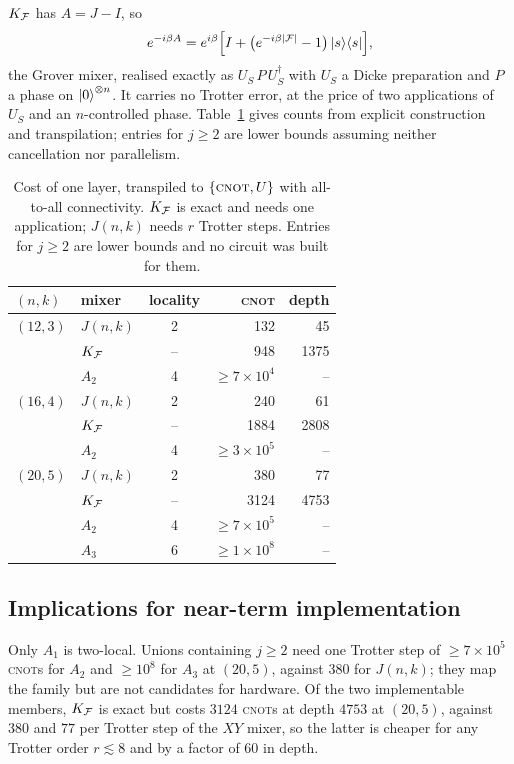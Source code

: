 $K_{\mathcal{F}}$ has $A=J-I$, so
\begin{equation}
e^{-i\beta A}=e^{i\beta}\Bigl[I +\bigl(e^{-i\beta|\mathcal{F}|}-1\bigr)\ket{s}\!\bra{s}\Bigr],
    \label{eq:grover-mixer}
\end{equation}
the Grover mixer, realised exactly as $U_S\,P\,U_S^{\dagger}$ with $U_S$ a Dicke preparation and $P$ a phase on $\ket{0}^{\otimes n}$. It carries no Trotter error, at the price of two applications of $U_S$ and an $n$-controlled phase. Table~\ref{tab:circuits} gives counts from explicit construction and transpilation; entries for $j\ge2$ are lower bounds assuming neither cancellation nor parallelism.

\begin{table}[t]
  \caption{Cost of one layer, transpiled to $\{\textsc{cnot},U\}$ with
all-to-all connectivity. $K_{\mathcal{F}}$ is exact and needs one application; $J(n,k)$ needs $r$ Trotter steps. Entries for $j\ge2$ are lower bounds and no circuit was built for them.}
  \label{tab:circuits}
  \begin{ruledtabular}
  \begin{tabular}{llcrr}
$(n,k)$ & mixer & locality & \textsc{cnot} & depth \\ \hline
    $(12,3)$ & $J(n,k)$ & 2  & 132  & 45   \\
             & $K_{\mathcal{F}}$ & -- & 948  & 1375 \\
             & $A_2$    & 4  & $\ge7\times10^{4}$ & -- \\[2pt]
    $(16,4)$ & $J(n,k)$ & 2  & 240  & 61   \\
             & $K_{\mathcal{F}}$ & -- & 1884 & 2808 \\
             & $A_2$    & 4  & $\ge3\times10^{5}$ & -- \\[2pt]
    $(20,5)$ & $J(n,k)$ & 2  & 380  & 77   \\
             & $K_{\mathcal{F}}$ & -- & 3124 & 4753 \\
             & $A_2$    & 4  & $\ge7\times10^{5}$ & -- \\
             & $A_3$    & 6  & $\ge1\times10^{8}$ & -- \\
  \end{tabular}
  \end{ruledtabular}
\end{table}

\subsection{\label{sec:nisq}Implications for near-term implementation}
Only $A_1$ is two-local. Unions containing $j\ge2$ need one Trotter step of $\ge7\times10^{5}$ \textsc{cnot}s for $A_2$ and $\ge10^{8}$ for $A_3$ at $(20,5)$, against $380$ for $J(n,k)$; they map the family but are not candidates for hardware. Of the two implementable members, $K_{\mathcal{F}}$ is exact but costs $3124$ \textsc{cnot}s at depth $4753$ at $(20,5)$, against $380$ and $77$ per Trotter step of the $XY$ mixer, so the latter is cheaper for any Trotter order $r\lesssim8$ and by a factor of $60$ in depth.

